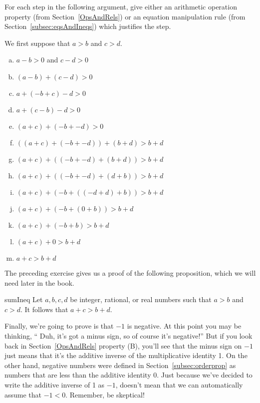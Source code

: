 \begin{exercise}{}
For each step in the following argument, give either an arithmetic operation property (from Section~\ref{OpsAndRels}) or an equation manipulation rule (from Section~\ref{subsec:eqsAndIneqs}) which justifies the step.

\noindent
We first suppose that $a>b$ and $c>d$. 
\begin{enumerate}[(a)]
\item
$a-b>0$ and $c-d>0$
\item
$(a-b) + (c-d) > 0$
\item
$a + (-b+c) - d > 0$
\item
$a + (c-b) - d > 0$
\item
$(a+c) + (-b + -d) > 0$
\item
$((a+c) + (-b + -d)) + (b+d) > b+d$
\item
$(a+c) + ((-b + -d) + (b+d)) > b+d$
\item
$(a+c) + ((-b + -d) + (d+b)) > b+d$
\item
$(a+c) + (-b + ((-d + d) +b)) > b+d$
\item
$(a+c) + (-b + (0 +b)) > b+d$
\item
$(a+c) + (-b + b) > b+d$
\item
$(a+c)  + 0 > b+d$
\item
$a+c > b+d$
\end{enumerate}
\end{exercise}

The preceding exercise gives us a proof of the following proposition, which we will need later in the book.

\begin{prop}{sumIneq}
Let $a,b,c,d$ be integer, rational, or real numbers such that $a>b$ and $c>d$.  It follows that  $a+c > b+d$.
\end{prop}

%
%


Finally, we're going to prove is that $-1$ is negative.  At this point you may be thinking, `` Duh,  it's got a minus sign, so of course it's negative!'' But if you look back in Section~\ref{OpsAndRels} property (B), you'll see that the minus sign on $-1$ just means that it's the additive inverse of the multiplicative identity 1. On the other hand, negative numbers were defined in  Section~\ref{subsec:orderprop} as numbers that are less than the additive identity 0.  Just because we've decided to write the additive inverse of 1 as $-1$, doesn't mean that we can automatically assume that $-1<0$.  Remember, be skeptical!

